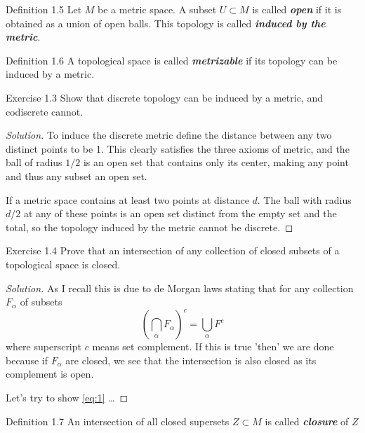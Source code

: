 \begin{thing3}{Definition 1.5}\leavevmode
	Let $M$ be a metric space. A subset $U \subset M$ is called \textit{\textbf{open }} if it is obtained as a union of open balls. This topology is called \textit{\textbf{induced by the metric}}.
\end{thing3}

\begin{thing3}{Definition 1.6}\leavevmode
A topological space is called \textit{\textbf{metrizable}} if its topology can be induced by a metric.	
\end{thing3}

\begin{thing4}{Exercise 1.3}\leavevmode
Show that discrete topology can be induced by a metric, and codiscrete cannot.	
\end{thing4}

\begin{proof}[Solution]\leavevmode
To induce the discrete metric define the distance between any two distinct points to be 1. This clearly satisfies the three axioms of metric, and the ball of radius $1/2$ is an open set that contains only its center, making any point and thus any subset an open set.

If a metric space contains at least two points at distance $d$. The ball with radius $d/2$ at any of these points is an open set distinct from the empty set and the total, so the topology induced by the metric cannot be discrete.
\end{proof}

\begin{thing4}{Exercise 1.4}\leavevmode
	Prove that an intersection of any collection of closed subsets of a topological space is closed.
\end{thing4}

\begin{proof}[Solution]\leavevmode
As I recall this is due to de Morgan laws stating that for any collection $F_\alpha$ of subsets
\begin{equation}\label{eq:1}\left( \bigcap_\alpha F_\alpha  \right)^c=\bigcup_{\alpha} F^c\end{equation}
where superscript $c$ means set complement. If this is true 'then' we are done because if $F_\alpha$ are closed, we see that the intersection is also closed as its complement is open.

{\color{2}Let's try to show \cref{eq:1} …}
\end{proof}

\begin{thing3}{Definition 1.7}\leavevmode
	An intersection of all closed supersets $Z \subset M$ is called \textit{\textbf{closure}} of $Z$
\end{thing3}

